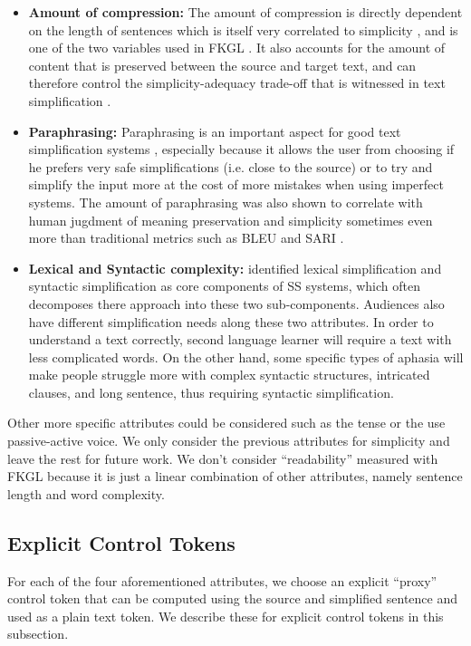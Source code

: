 \documentclass[10pt, a4paper]{article}
\begin{document}
\begin{itemize}
\item
{\bf Amount of compression:}
The amount of compression is directly dependent on the length of sentences which is itself very correlated to simplicity \cite{martin2019reference}, and is one of the two variables used in FKGL \cite{kincaid1975derivation}.
It also accounts for the amount of content that is preserved between the source and target text, and can therefore control the simplicity-adequacy trade-off that is witnessed in text simplification \cite{schwarzer2018human}.

\item
{\bf Paraphrasing:}
Paraphrasing is an important aspect for good text simplification systems \cite{wubben2012sentence}, especially because it allows the user from choosing if he prefers very safe simplifications (i.e. close to the source) or to try and simplify the input more at the cost of more mistakes when using imperfect systems.
The amount of paraphrasing was also shown to correlate with human jugdment of meaning preservation and simplicity sometimes even more than traditional metrics such as BLEU \cite{papineni2002bleu} and SARI \cite{xu2016optimizing}.


\item
{\bf Lexical and Syntactic complexity:}
\cite{shardlow2014survey} identified lexical simplification and syntactic simplification as core components of SS systems, which often decomposes there approach into these two sub-components. Audiences also have different simplification needs along these two attributes. In order to understand a text correctly, second language learner will require a text with less complicated words. On the other hand, some specific types of aphasia will make people struggle more with complex syntactic structures, intricated clauses, and long sentence, thus requiring syntactic simplification.
\end{itemize}

Other more specific attributes could be considered such as the tense or the use passive-active voice. We only consider the previous attributes for simplicity and leave the rest for future work.
We don't consider ``readability'' measured with FKGL because it is just a linear combination of other attributes, namely sentence length and word complexity.

\subsection{Explicit Control Tokens}
For each of the four aforementioned attributes, we choose an explicit ``proxy'' control token that can be computed using the source and simplified sentence and used as a plain text token.
We describe these for explicit control tokens in this subsection.
\end{document}
